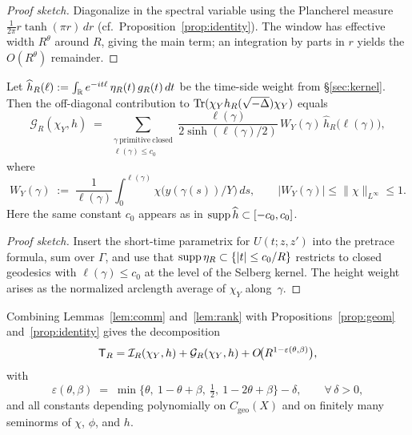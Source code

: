 \begin{proof}[Proof sketch]
Diagonalize in the spectral variable using the Plancherel measure
$\frac{1}{2\pi}r\tanh(\pi r)\,dr$ (cf.\ Proposition~\ref{prop:identity}). The window
has effective width $R^\theta$ around $R$, giving the main term; an integration
by parts in $r$ yields the $O(R^\theta)$ remainder.
\end{proof}

\begin{proposition}\label{prop:geom}
Let $\widehat h_R(\ell):=\int_{\mathbb{R}}e^{-it\ell}\, \eta_R(t)\, g_R(t)\,dt$ be the
time-side weight from \S\ref{sec:kernel}. Then the off-diagonal contribution to
$\mathrm{Tr}(\chi_Y h_R(\sqrt{-\Delta})\chi_Y)$ equals
\[
  \mathcal{G}_R(\chi_Y,h)
  \;=\;\sum_{\substack{\gamma\ \mathrm{primitive\ closed}\\ \ell(\gamma)\le c_0}}
  \frac{\ell(\gamma)}{2\sinh(\ell(\gamma)/2)}\,
  W_Y(\gamma)\,\widehat h_R\!\big(\ell(\gamma)\big),
\]
where
\[
  W_Y(\gamma)
  \;:=\;\frac{1}{\ell(\gamma)}\int_0^{\ell(\gamma)}
         \chi\!\big(y(\gamma(s))/Y\big)\,ds,
  \qquad |W_Y(\gamma)| \le \|\chi\|_{L^\infty}\le 1.
\]
Here the same constant $c_0$ appears as in $\operatorname{supp}\widehat h\subset[-c_0,c_0]$.
\end{proposition}

\begin{proof}[Proof sketch]
Insert the short-time parametrix for $U(t;z,z')$ into the pretrace formula,
sum over $\Gamma$, and use that $\operatorname{supp}\eta_R\subset\{|t|\le c_0/R\}$ restricts
to closed geodesics with $\ell(\gamma)\le c_0$ at the level of the Selberg
kernel. The height weight arises as the normalized arclength average of $\chi_Y$
along~$\gamma$.
\end{proof}

Combining Lemmas~\ref{lem:comm} and~\ref{lem:rank} with
Propositions~\ref{prop:geom} and~\ref{prop:identity} gives the decomposition
\[
  \mathsf{T}_R=\mathcal{I}_R(\chi_Y,h)+\mathcal{G}_R(\chi_Y,h)+O\!\big(R^{1-\varepsilon(\theta,\beta)}\big),
\]
with
\[
  \varepsilon(\theta,\beta)
  \;=\;\min\Big\{\theta,\ 1-\theta+\beta,\ \tfrac12,\ 1-2\theta+\beta\Big\}-\delta,
  \qquad \forall\,\delta>0,
\]
and all constants depending polynomially on $C_{\mathrm{geo}}(X)$ and on finitely
many seminorms of $\chi$, $\phi$, and $h$.
